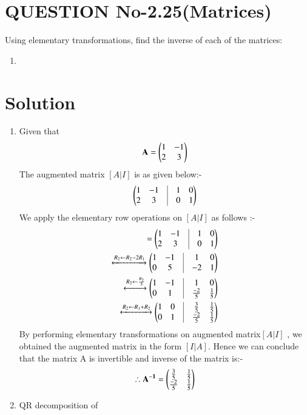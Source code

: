\documentclass[journal,12pt,twocolumn]{IEEEtran}
\begin{document}
\section{QUESTION No-2.25(Matrices)}
Using elementary transformations, find the inverse of each of the matrices:
\begin{enumerate}
\item {}
\end{enumerate}
\section{Solution}
\begin{enumerate}
\item Given that
\begin{align}
\mathbf{A} = \begin{pmatrix}1 & -1 \\ 2 & 3\end{pmatrix}
\end{align}
The augmented matrix $ [A | I]$ is as given below:- 
\begin{align}
\myvec{1 & -1 & \vrule & 1 & 0 \\ 2 & 3 & \vrule & 0 & 1}
\end{align}
We apply the elementary row operations on $ [A | I]$ as follows :-
\begin{align}
[A | I] = \myvec{1 & -1 & \vrule & 1 & 0 \\ 2 & 3 & \vrule & 0 & 1}
\\
\xleftrightarrow{R_2\leftarrow R_2-2R_1}   
\myvec{1 & -1 & \vrule & 1 & 0 \\ 0 & 5 & \vrule & -2 & 1}
\\
\xleftrightarrow{R_2\leftarrow \frac{R_2}{5}}
\myvec{1 & -1 & \vrule & 1 & 0 \\ 0 & 1 & \vrule & \frac {-2}{5} & \frac {1}{5}}
\\
\xleftrightarrow{R_2\leftarrow R_1+R_2}
\myvec{1 & 0 & \vrule & \frac{3}{5} & \frac{1}{5} \\ 0 & 1 & \vrule & \frac{-2}{5} & \frac{1}{5}}
\end{align}
By performing elementary transformations on augmented matrix$ [A | I]$ , we obtained the augmented matrix in the form $ [I | A]$. 
Hence we can conclude that the matrix A is invertible and inverse of the matrix is:-
\begin{align}
\therefore\mathbf{A^{-1}}=\begin{pmatrix}\frac{3}{5} & \frac{1}{5} \\  \frac{-2}{5} & \frac{1}{5}\end{pmatrix} 
\end{align}
\item QR decomposition of  

\end{enumerate}
\end{document}

